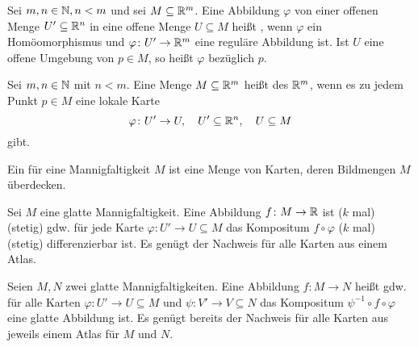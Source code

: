 \begin{definition}\mbox{}\newline
Sei $m,n\in\mathbb N, n<m$ und sei $M\subseteq\mathbb R^m$.
Eine Abbildung $\varphi$ von einer offenen Menge $U'\subseteq\mathbb R^n$
in eine offene Menge $U\subseteq M$ heißt ,
wenn $\varphi$ ein Homöomorphismus und $\varphi\colon U'\to\mathbb R^m$
eine reguläre Abbildung ist. Ist $U$ eine offene Umgebung von
$p\in M$, so heißt $\varphi$  bezüglich $p$.
\end{definition}
\pagebreak[1]

\begin{definition}\mbox{}\newline
Sei $m,n\in\mathbb N$ mit $n<m$. Eine Menge $M\subseteq\mathbb R^m$ heißt
 des $\mathbb R^m$, wenn
es zu jedem Punkt $p\in M$ eine lokale Karte
\begin{equation}
\varphi\colon U'\to U,\quad U'\subseteq\mathbb R^n,\quad U\subseteq M
\end{equation}
gibt.
\end{definition}

\begin{definition}[Atlas]\mbox{}\newline
Ein  für eine Mannigfaltigkeit $M$
ist eine Menge von Karten, deren Bildmengen $M$ überdecken.
\end{definition}

\begin{definition}\mbox{}\newline
Sei $M$ eine glatte Mannigfaltigkeit.
Eine Abbildung $f\colon M\to\mathbb R$ ist ($k$ mal) (stetig)
gdw. für jede Karte $\varphi\colon U'\to U\subseteq M$ das
Kompositum $f\circ\varphi$ ($k$ mal) (stetig) differenzierbar ist.
Es genügt der Nachweis für alle Karten aus einem Atlas.
\end{definition}

\begin{definition}\mbox{}\newline
Seien $M,N$ zwei glatte Mannigfaltigkeiten.
Eine Abbildung $f\colon M\to N$ heißt 
gdw. für alle Karten $\varphi\colon U'\to U\subseteq M$ und
$\psi\colon V'\to V\subseteq N$ das Kompositum
$\psi^{-1}\circ f\circ\varphi$ eine glatte Abbildung ist.
Es genügt bereits der Nachweis für alle Karten aus jeweils einem
Atlas für $M$ und $N$.
\end{definition}

